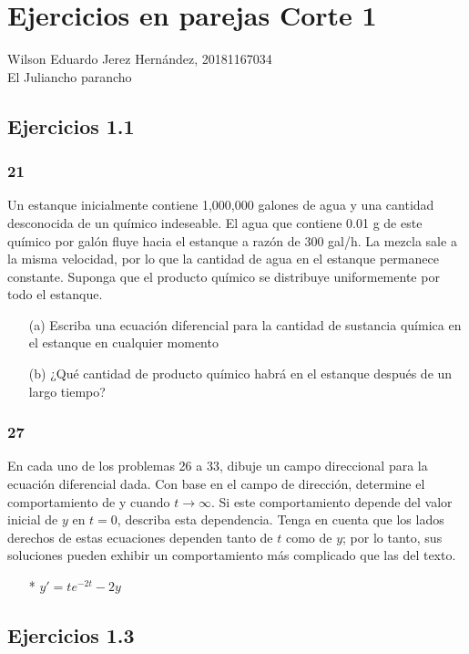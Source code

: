 \documentclass{book}
\numberwithin{equation}{section}
\theoremstyle{plain}  %
\begin{document}
    \chapter*{Ejercicios en parejas Corte 1}
    \noindent
    Wilson Eduardo Jerez Hernández, 20181167034 \\
    El Juliancho parancho
    \section*{Ejercicios 1.1}
    \subsection*{21} 
    Un estanque inicialmente contiene 1,000,000 galones de agua y una cantidad desconocida de un químico indeseable. 
    El agua que contiene 0.01 g de este químico por galón fluye hacia el estanque a razón de 300 gal/h. 
    La mezcla sale a la misma velocidad, por lo que la cantidad de agua en el estanque permanece constante. 
    Suponga que el producto químico se distribuye uniformemente por todo el estanque. 
    \begin{itemize}
        \item[(a)]Escriba una ecuación diferencial para la cantidad de sustancia química en el estanque en cualquier momento
        \item[(b)] ¿Qué cantidad de producto químico habrá en el estanque después de un largo tiempo?
    \end{itemize}
    \subsection*{27}
    En cada uno de los problemas 26 a 33, dibuje un campo direccional para la ecuación diferencial dada. Con base en el campo de dirección, determine el comportamiento de y cuando
    $t \to \infty$. Si este comportamiento depende del valor inicial de $y$ en $t = 0$, describa esta dependencia. Tenga en cuenta que los lados derechos de estas ecuaciones dependen tanto de $t$ como de $y$; por lo tanto, sus soluciones pueden exhibir un comportamiento más complicado que las del texto.
    \\ 
    \begin{itemize}
        \item[*] $y'=te^{-2t}-2y$
    \end{itemize}
    \section*{Ejercicios 1.3}
\end{document}
